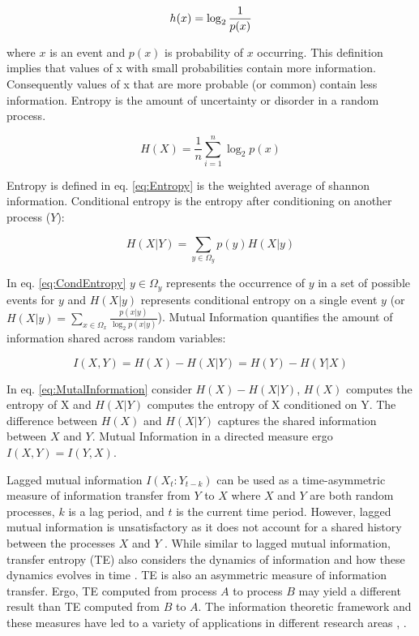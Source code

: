 \begin{equation}
\label{{eq:shannonInfo}}
h(x) = \log_2 \frac{1}{p(x)}
\end{equation}

\noindent where \(x\) is an event and \(p(x)\) is probability of \(x\) occurring. This definition implies that values of x with small probabilities contain more information. Consequently values of x that are more probable (or common) contain less information. Entropy is the amount of uncertainty or disorder in a random process.

\begin{equation}
\label{eq:Entropy}
H(X) =  \frac{1}{n} \sum_{i=1}^n  \log_2 p(x)
\end{equation}


\noindent Entropy is defined in eq. \ref{eq:Entropy} is the weighted average of shannon information.  Conditional entropy is the entropy after conditioning on another process (\(Y\)):

\begin{equation}
\label{eq:CondEntropy}
H(X|Y) = \sum_{y \in \Omega_y} p(y) H(X|y)
\end{equation}

\noindent In eq. \ref{eq:CondEntropy} \(y \in \Omega_y\) represents the occurrence of \(y\) in a set of possible events for \(y\) and \(H(X|y)\) represents conditional entropy on a single event \(y\) (or \(H(X|y) = \sum_{x \in \Omega_x}  \frac{p(x|y)}{\log_2p(x|y)} \)). Mutual Information quantifies the amount of information shared across random variables:

\begin{equation}
\label{eq:MutalInformation}
I(X,Y) = H(X) - H(X|Y) = H(Y) - H(Y|X)
\end{equation}

\noindent In eq. \ref{eq:MutalInformation} consider \(H(X) - H(X|Y)\),  \(H(X)\) computes the entropy of X and \(H(X|Y)\) computes the entropy of X conditioned on Y. The difference between \(H(X)\) and \(H(X|Y)\) captures the shared information between \(X\) and \(Y\). Mutual Information in a directed measure ergo \(I(X,Y) = I(Y,X)\).

Lagged mutual information \(I(X_t : Y_{t-k})\) can be used as a time-asymmetric measure of information transfer from \(Y\) to \(X\) where \(X\) and \(Y\) are both random processes, \(k\) is a lag period, and \(t\) is the current time period. However, lagged mutual information is unsatisfactory as it does not account for a shared history between the processes \(X\) and \(Y\) \cite{MIdiffTE}. While similar to lagged mutual information, transfer entropy (TE) also considers the dynamics of information and how these dynamics evolves in time \cite{IntroToTransferEntropy}. TE is also an asymmetric measure of information transfer. Ergo, TE computed from process \(A\) to process \(B\) may yield a different result than TE computed from \(B\) to \(A\). The information theoretic framework and these measures have led to a variety of applications in different research areas \cite{InfoTheoryApplications}, \cite{TEBook}.


